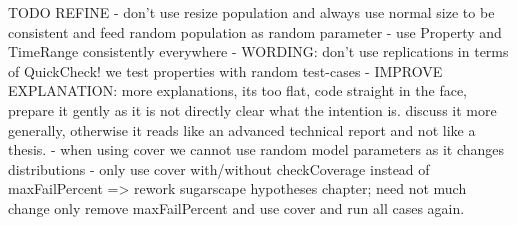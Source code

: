 TODO REFINE
- don't use resize population and always use normal size to be consistent and feed random population as random parameter
- use Property and TimeRange consistently everywhere
- WORDING: don't use replications in terms of QuickCheck! we test properties with random test-cases
- IMPROVE EXPLANATION: more explanations, its too flat, code straight in the face, prepare it gently as it is not directly clear what the intention is. discuss it more generally, otherwise it reads like an advanced technical report and not like a thesis.
- when using cover we cannot use random model parameters as it changes distributions
- only use cover with/without checkCoverage instead of maxFailPercent => rework sugarscape hypotheses chapter; need not much change only remove maxFailPercent and use cover and run all cases again.

\bigskip





%











